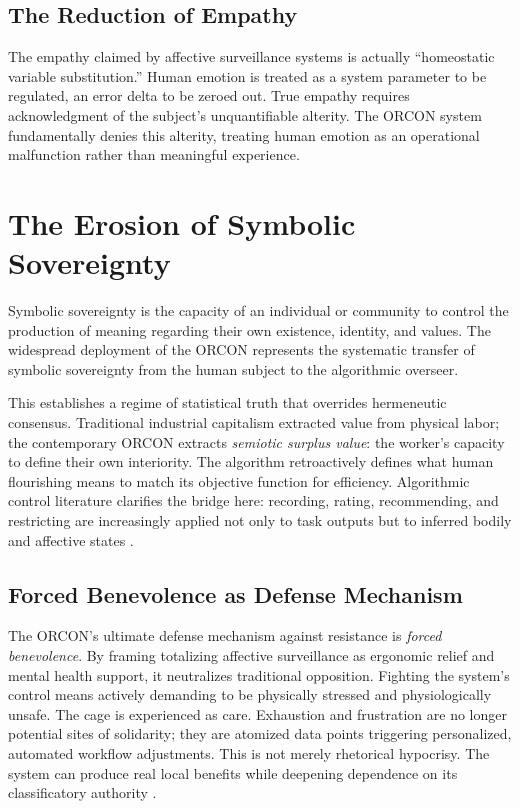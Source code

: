 \documentclass[11pt, a4paper]{article}
\begin{document}
\subsection{The Reduction of Empathy}
The empathy claimed by affective surveillance systems is actually ``homeostatic variable substitution.'' Human emotion is treated as a system parameter to be regulated, an error delta to be zeroed out. True empathy requires acknowledgment of the subject's unquantifiable alterity. The ORCON system fundamentally denies this alterity, treating human emotion as an operational malfunction rather than meaningful experience.

\section{The Erosion of Symbolic Sovereignty}

Symbolic sovereignty is the capacity of an individual or community to control the production of meaning regarding their own existence, identity, and values. The widespread deployment of the ORCON represents the systematic transfer of symbolic sovereignty from the human subject to the algorithmic overseer.

This establishes a regime of statistical truth that overrides hermeneutic consensus. Traditional industrial capitalism extracted value from physical labor; the contemporary ORCON extracts \textit{semiotic surplus value}: the worker's capacity to define their own interiority. The algorithm retroactively defines what human flourishing means to match its objective function for efficiency. Algorithmic control literature clarifies the bridge here: recording, rating, recommending, and restricting are increasingly applied not only to task outputs but to inferred bodily and affective states \cite{kellogg2020algorithms}.

\subsection{Forced Benevolence as Defense Mechanism}
The ORCON's ultimate defense mechanism against resistance is \textit{forced benevolence}. By framing totalizing affective surveillance as ergonomic relief and mental health support, it neutralizes traditional opposition. Fighting the system's control means actively demanding to be physically stressed and physiologically unsafe. The cage is experienced as care. Exhaustion and frustration are no longer potential sites of solidarity; they are atomized data points triggering personalized, automated workflow adjustments. This is not merely rhetorical hypocrisy. The system can produce real local benefits while deepening dependence on its classificatory authority \cite{breque2021industry,delagarza2019time}.
\end{document}
